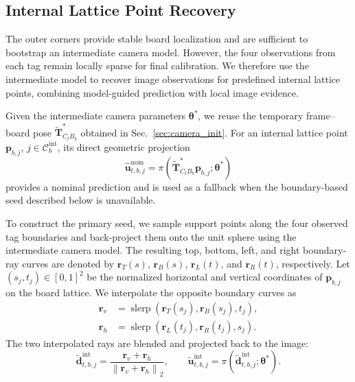 \documentclass[letterpaper, 10 pt, conference]{ieeeconf}  %
\begin{document}
\subsection{Internal Lattice Point Recovery}
\label{sec:internal_point_recovery}

The outer corners provide stable board localization and are sufficient
to bootstrap an intermediate camera model. However, the four
observations from each tag remain locally sparse for final calibration.
We therefore use the intermediate model to recover image observations
for predefined internal lattice points, combining model-guided
prediction with local image evidence.

Given the intermediate camera parameters $\boldsymbol{\theta}^{*}$,
we reuse the temporary frame--board pose
$\widetilde{\mathbf{T}}^{*}_{C_tB_b}$ obtained in Sec.~\ref{sec:camera_init}.
For an internal lattice point
$\mathbf{p}_{b,j}$, $j\in\mathcal{C}^{\mathrm{int}}_b$, its direct
geometric projection
\begin{equation}
\widehat{\mathbf{u}}^{\mathrm{nom}}_{t,b,j}
=
\pi\!\left(
\widetilde{\mathbf{T}}^{*}_{C_tB_b}
\mathbf{p}_{b,j};
\boldsymbol{\theta}^{*}
\right)
\label{eq:nominal_internal_prediction}
\end{equation}
provides a nominal prediction and is used as a fallback when the
boundary-based seed described below is unavailable.

To construct the primary seed, we sample support points along the four
observed tag boundaries and back-project them onto the unit sphere using
the intermediate camera model. The resulting top, bottom, left, and
right boundary-ray curves are denoted by
$\mathbf{r}_{T}(s)$, $\mathbf{r}_{B}(s)$,
$\mathbf{r}_{L}(t)$, and $\mathbf{r}_{R}(t)$, respectively.
Let $(s_j,t_j)\in[0,1]^2$ be the normalized horizontal and vertical
coordinates of $\mathbf{p}_{b,j}$ on the board lattice. We interpolate
the opposite boundary curves as
\begin{equation}
\begin{aligned}
\mathbf{r}_{v}
&=
\operatorname{slerp}\!\left(
\mathbf{r}_{T}(s_j),
\mathbf{r}_{B}(s_j),
t_j
\right),\\
\mathbf{r}_{h}
&=
\operatorname{slerp}\!\left(
\mathbf{r}_{L}(t_j),
\mathbf{r}_{R}(t_j),
s_j
\right).
\end{aligned}
\label{eq:spherical_boundary_interpolation}
\end{equation}
The two interpolated rays are blended and projected back to the image:
\begin{equation}
\widetilde{\mathbf{d}}^{\mathrm{int}}_{t,b,j}
=
\frac{\mathbf{r}_{v}+\mathbf{r}_{h}}
{\left\|\mathbf{r}_{v}+\mathbf{r}_{h}\right\|_2},
\qquad
\widetilde{\mathbf{u}}^{\mathrm{int}}_{t,b,j}
=
\pi\!\left(
\widetilde{\mathbf{d}}^{\mathrm{int}}_{t,b,j};
\boldsymbol{\theta}^{*}
\right).
\label{eq:internal_point_seed}
\end{equation}
\end{document}
